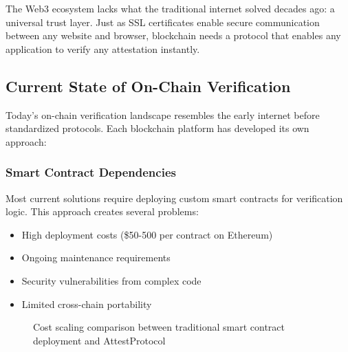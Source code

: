 \documentclass[11pt,a4paper]{article}
\begin{document}
The Web3 ecosystem lacks what the traditional internet solved decades ago: a universal trust layer. Just as SSL certificates enable secure communication between any website and browser, blockchain needs a protocol that enables any application to verify any \gls{attestation} instantly.

\subsection{Current State of On-Chain Verification}

Today's on-chain verification landscape resembles the early internet before standardized protocols. Each blockchain platform has developed its own approach:

\subsubsection{Smart Contract Dependencies}
Most current solutions require deploying custom smart contracts for verification logic. This approach creates several problems:
\begin{itemize}
    \item High deployment costs (\$50-500 per contract on Ethereum)
    \item Ongoing maintenance requirements 
    \item Security vulnerabilities from complex code
    \item Limited cross-chain portability
\end{itemize}

\begin{figure}[H]
\centering
{}
\caption{Cost scaling comparison between traditional smart contract deployment and AttestProtocol}
\label{fig:cost-comparison}
\end{figure}
\end{document}
